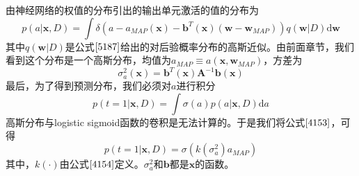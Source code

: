 由神经网络的权值的分布引出的输出单元激活的值的分布为
\begin{equation}
\label{5187}
	p(a|\boldsymbol{x},D)=\int \delta (a-a_{MAP}(\boldsymbol{x})-\boldsymbol{b}^T(\boldsymbol{x})(\boldsymbol{w}-\boldsymbol{w}_{MAP}))q(\boldsymbol{w}|D)\mathrm{d}\boldsymbol{w}
\end{equation}
其中$q(\boldsymbol{w}|D)$是公式$\ref{5187}$给出的对后验概率分布的高斯近似。由前面章节，我们看到这个分布是一个高斯分布，均值为$a_{MAP}\equiv a(\boldsymbol{x},\boldsymbol{w}_{MAP})$，方差为 
\begin{equation}
	\sigma_a^2(\boldsymbol{x})=\boldsymbol{b}^T(\boldsymbol{x})\boldsymbol{A}^{-1}\boldsymbol{b}(\boldsymbol{x})
\end{equation}
最后，为了得到预测分布，我们必须对$a$进行积分
\begin{equation}
	p(t=1|\boldsymbol{x},D)=\int \sigma(a)p(a|\boldsymbol{x},D)\mathrm{d}a
\end{equation}
高斯分布与logistic sigmoid函数的卷积是无法计算的。于是我们将公式$\ref{4153}$，可得
\begin{equation}
	p(t=1|\boldsymbol{x},D)=\sigma(k(\sigma_a^2)a_{MAP})
\end{equation}
其中，$k(\cdot)$由公式$\ref{4154}$定义。$\sigma_a^2$和$\boldsymbol{b}$都是$\boldsymbol{x}$的函数。